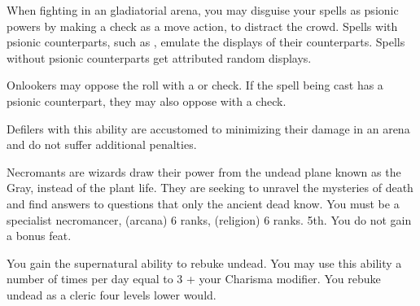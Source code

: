 {

	When fighting in an gladiatorial arena, you may disguise your spells as psionic powers by making a  check as a move action, to distract the crowd. Spells with psionic counterparts, such as , emulate the displays of their counterparts. Spells without psionic counterparts get attributed random displays.

	Onlookers may oppose the roll with a  or  check. If the spell being cast has a psionic counterpart, they may also oppose with a  check.

	Defilers with this ability are accustomed to minimizing their damage in an arena and do not suffer additional penalties.
}
{Necromants are wizards draw their power from the undead plane known as the Gray, instead of the plant life. They are seeking to unravel the mysteries of death and find answers to questions that only the ancient dead know.}
{You must be a specialist necromancer,  (arcana) 6 ranks,  (religion) 6 ranks.}
{5th.}
{You do not gain a bonus feat.}
{

	You gain the supernatural ability to rebuke undead. You may use this ability a number of times per day equal to 3 + your Charisma modifier. You rebuke undead as a cleric four levels lower would.
}
